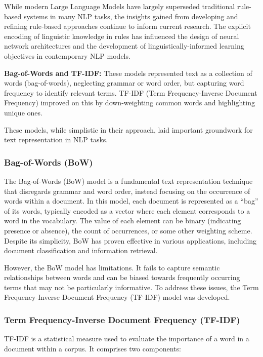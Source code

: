 While modern Large Language Models have largely superseded traditional rule-based systems in many NLP tasks, the insights gained from developing and refining rule-based approaches continue to inform current research. The explicit encoding of linguistic knowledge in rules has influenced the design of neural network architectures and the development of linguistically-informed learning objectives in contemporary NLP models.

\textbf{Bag-of-Words and TF-IDF:} These models represented text as a collection of words (bag-of-words), neglecting grammar or word order, but capturing word frequency to identify relevant terms. TF-IDF (Term Frequency-Inverse Document Frequency) improved on this by down-weighting common words and highlighting unique ones.

These models, while simplistic in their approach, laid important groundwork for text representation in NLP tasks.

\subsubsection{Bag-of-Words (BoW)}
The Bag-of-Words (BoW) model is a fundamental text representation technique that disregards grammar and word order, instead focusing on the occurrence of words within a document. In this model, each document is represented as a ``bag'' of its words, typically encoded as a vector where each element corresponds to a word in the vocabulary. The value of each element can be binary (indicating presence or absence), the count of occurrences, or some other weighting scheme. Despite its simplicity, BoW has proven effective in various applications, including document classification and information retrieval.

However, the BoW model has limitations. It fails to capture semantic relationships between words and can be biased towards frequently occurring terms that may not be particularly informative. To address these issues, the Term Frequency-Inverse Document Frequency (TF-IDF) model was developed.

\subsubsection{Term Frequency-Inverse Document Frequency (TF-IDF)}
TF-IDF is a statistical measure used to evaluate the importance of a word in a document within a corpus. It comprises two components:

